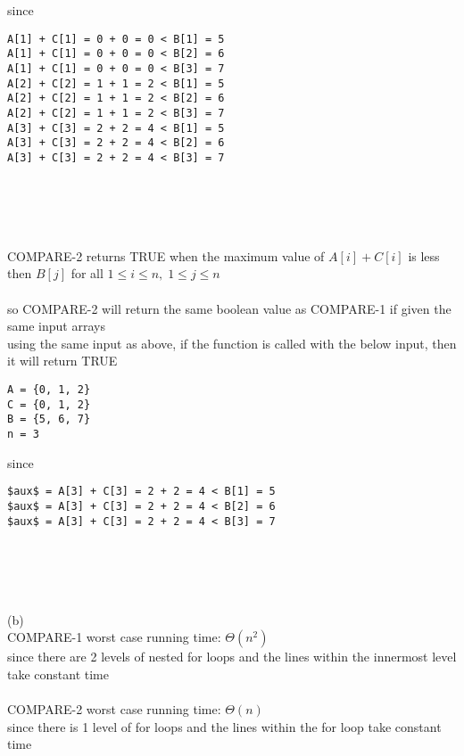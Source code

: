 \documentclass[12pt,border=4pt,multi]{article}%
\begin{document}
since
\begin{lstlisting}
A[1] + C[1] = 0 + 0 = 0 < B[1] = 5
A[1] + C[1] = 0 + 0 = 0 < B[2] = 6
A[1] + C[1] = 0 + 0 = 0 < B[3] = 7
A[2] + C[2] = 1 + 1 = 2 < B[1] = 5
A[2] + C[2] = 1 + 1 = 2 < B[2] = 6
A[2] + C[2] = 1 + 1 = 2 < B[3] = 7
A[3] + C[3] = 2 + 2 = 4 < B[1] = 5
A[3] + C[3] = 2 + 2 = 4 < B[2] = 6
A[3] + C[3] = 2 + 2 = 4 < B[3] = 7
\end{lstlisting}
\leavevmode
\\
\\
\\
\\
COMPARE-2 returns TRUE when the maximum value of $A[i] + C[i]$ is less then $B[j]$ for all $1 \leq i \leq n, \; 1 \leq j \leq n$\\
\\
so COMPARE-2 will return the same boolean value as COMPARE-1 if given the same input arrays\\
using the same input as above, if the function is called with the below input, then it will return TRUE
\begin{lstlisting}
A = {0, 1, 2}
C = {0, 1, 2}
B = {5, 6, 7}
n = 3
\end{lstlisting}
since
\begin{lstlisting}[mathescape = true]
$aux$ = A[3] + C[3] = 2 + 2 = 4 < B[1] = 5
$aux$ = A[3] + C[3] = 2 + 2 = 4 < B[2] = 6
$aux$ = A[3] + C[3] = 2 + 2 = 4 < B[3] = 7
\end{lstlisting}
\leavevmode
\\
\\
\\
\\
(b)\\
COMPARE-1 worst case running time: $\Theta(n^2)$\\
since there are 2 levels of nested for loops and the lines within the innermost level take constant time\\
\\
COMPARE-2 worst case running time: $\Theta(n)$\\
since there is 1 level of for loops and the lines within the for loop take constant time\\
\end{document}
